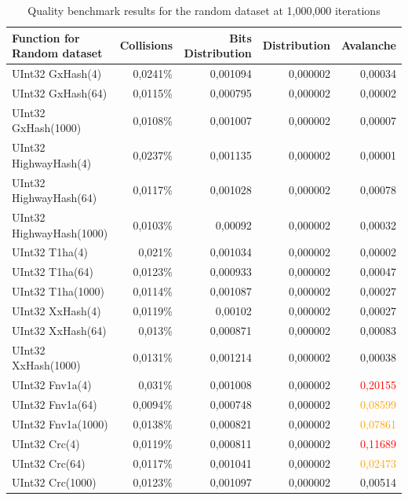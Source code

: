 \documentclass[10pt]{article}
\begin{document}
\begin{table}[H]
\centering
\begin{tabular}{|l|r|r|r|r|}
\hline
\textbf{Function for Random dataset} & \textbf{Collisions} & \textbf{Bits Distribution} & \textbf{Distribution} & \textbf{Avalanche} \\
\hline
UInt32 GxHash(4)            & 0,0241\% & 0,001094  & 0,000002 & 0,00034 \\
UInt32 GxHash(64)           & 0,0115\% & 0,000795  & 0,000002 & 0,00002 \\
UInt32 GxHash(1000)         & 0,0108\%  & 0,001007  & 0,000002 & 0,00007 \\
UInt32 HighwayHash(4)        & 0,0237\% & 0,001135  & 0,000002 & 0,00001 \\
UInt32 HighwayHash(64)       & 0,0117\% & 0,001028  & 0,000002 & 0,00078 \\
UInt32 HighwayHash(1000)     & 0,0103\% & 0,00092   & 0,000002 & 0,00032 \\
UInt32 T1ha(4)               & 0,021\%  & 0,001034  & 0,000002 & 0,00002 \\
UInt32 T1ha(64)              & 0,0123\% & 0,000933  & 0,000002 & 0,00047 \\
UInt32 T1ha(1000)            & 0,0114\% & 0,001087  & 0,000002 & 0,00027 \\
UInt32 XxHash(4)            & 0,0119\% & 0,00102   & 0,000002 & 0,00027 \\
UInt32 XxHash(64)           & 0,013\%  & 0,000871  & 0,000002 & 0,00083 \\
UInt32 XxHash(1000)         & 0,0131\% & 0,001214  & 0,000002 & 0,00038 \\
UInt32 Fnv1a(4)             & 0,031\%  & 0,001008  & 0,000002 & \textcolor{red}{0,20155} \\
UInt32 Fnv1a(64)            & 0,0094\% & 0,000748  & 0,000002 & \textcolor{orange}{0,08599} \\
UInt32 Fnv1a(1000)          & 0,0138\% & 0,000821  & 0,000002 & \textcolor{orange}{0,07861} \\
UInt32 Crc(4)               & 0,0119\% & 0,000811  & 0,000002 & \textcolor{red}{0,11689} \\
UInt32 Crc(64)              & 0,0117\% & 0,001041  & 0,000002 & \textcolor{orange}{0,02473} \\
UInt32 Crc(1000)            & 0,0123\% & 0,001097  & 0,000002 & 0,00514 \\
\hline
\end{tabular}
\caption{Quality benchmark results for the random dataset at 1,000,000 iterations}
\label{tab:scores-random}
\end{table}
    
\end{document}
